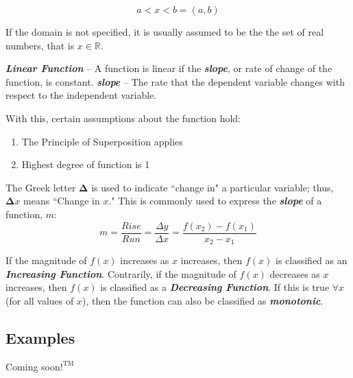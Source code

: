 \begin{equation}
a < x < b = (a, b)
\end{equation}
 
\vspace{0.1in}
If the domain is not specified, it is usually assumed to be the the set of real numbers, that is $x \in \mathbb{R}$.

\vspace{0.25in}
\textbf{\textit{Linear Function}} -- A function is linear if the \textbf{\textit{slope}}, or rate of change of the function, is constant.
\textbf{\textit{slope}} -- The rate that the dependent variable changes with respect to the independent variable.

\vspace{0.1in}
With this, certain assumptions about the function hold:
\begin{enumerate}
\item The Principle of Superposition applies\\
\vspace{-0.25in}
\item Highest degree of function is 1\\
\end{enumerate}

\vspace{0.1in}
The Greek letter $\bm{\Delta}$ is used to indicate ``change in" a particular variable; thus, $\bm{\Delta} x$ means ``Change in $x$." This is commonly used to express the \textbf{\textit{slope}} of a function, $m$:
\begin{equation}
m = \frac{Rise}{Run} = \frac{\Delta y}{\Delta x} = \frac{f\left(x_2\right) - f\left(x_1\right)}{x_2 - x_1}
\end{equation}

\vspace{0.1in}
If the magnitude of $f(x)$ increases as $x$ increases, then $f(x)$ is classified as an \textbf{\textit{Increasing Function}}. Contrarily, if the magnitude of $f(x)$ decreases as $x$ increases, then $f(x)$ is classified as a \textbf{\textit{Decreasing Function}}. If this is true $\forall x$ (for all values of $x$), then the function can also be classified as \textbf{\textit{monotonic}}.

\begin{center}
\section*{\small Examples}
Coming soon$!^{\text{TM}}$
\end{center}

